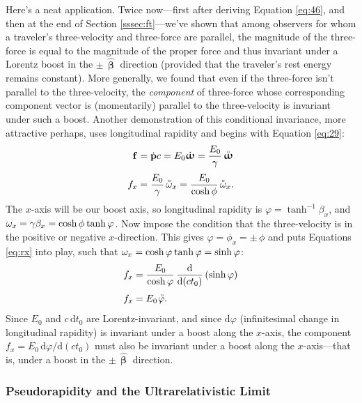 \documentclass[12pt]{article}
\renewcommand{\mathring}[1]{\accentset{\circ}{#1}}
\renewcommand{\vv}[1]{\mathbf{#1}}
\newcommand{\dd}[1]{\mathrm{d}#1}
\newcommand{\hatbeta}{\bm{\hat{\upbeta}}}
\newcommand{\vvomega}{\bm{\upomega}}
\begin{document}
Here's a neat application. Twice now---first after deriving Equation \ref{eq:46}, and then at the end of Section \ref{sssec:ft}---we've shown that among observers for whom a traveler's three-velocity and three-force are parallel, the magnitude of the three-force is equal to the magnitude of the proper force and thus invariant under a Lorentz boost in the $\pm \, \hatbeta$ direction (provided that the traveler's rest energy remains constant). More generally, we found that even if the three-force isn't parallel to the three-velocity, the \emph{component} of three-force whose corresponding component vector is (momentarily) parallel to the three-velocity is invariant under such a boost. Another demonstration of this conditional invariance, more attractive perhaps, uses longitudinal rapidity and begins with Equation \ref{eq:29}:
\begin{equation*}
\begin{split}
\vv f &= \dot{\vv p} c = E_0 \dot{\vvomega} =  \dfrac{E_0}{\gamma} \, \mathring{\vvomega} \\[3pt]
f_x & = \dfrac{E_0}{\gamma} \, \mathring{\omega}_x = \dfrac{E_0}{\cosh{\phi}} \, \mathring{\omega}_x .
\end{split}
\end{equation*}
The $x$-axis will be our boost axis, so longitudinal rapidity is $\varphi = \tanh^{-1}{\beta_x}$, and $\omega_x = \gamma \beta_x = \cosh{\phi} \mkern1mu \tanh{\varphi}$. Now impose the condition that the three-velocity is in the positive or negative $x$-direction. This gives $\varphi = \phi_x = \pm \, \phi$ and puts Equations \ref{eq:rx} into play, such that $\omega_x = \cosh{\varphi} \mkern1mu \tanh{\varphi} = \sinh{\varphi}$:
\begin{equation*}
\begin{split}
f_x &= \dfrac{E_0}{\cosh{\varphi}} \, \dfrac{\dd}{\dd (c t_0)} \left( \sinh{\varphi} \right)  \\[3pt]
f_x &= E_0 \mkern1.5mu \mathring{\varphi} .
\end{split}
\end{equation*}
Since $E_0$ and $c \, \dd t_0$ are Lorentz-invariant, and since $\dd \varphi$ (infinitesimal change in longitudinal rapidity) is invariant under a boost along the $x$-axis, the component $f_x = E_0 \, \dd \varphi / \dd (c t_0)$ must also be invariant under a boost along the $x$-axis---that is, under a boost in the $\pm \, \hatbeta$ direction.


\subsubsection{Pseudorapidity and the Ultrarelativistic Limit}
\end{document}
